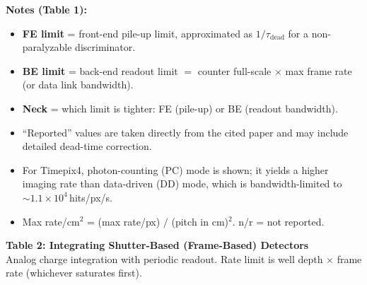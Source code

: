 \documentclass[10pt]{article}
\begin{document}
\vspace{4pt}
\noindent\textbf{Notes (Table 1):}
\begin{itemize}\setlength{\itemsep}{1pt}
  \item \textbf{FE limit} = front-end pile-up limit, approximated as $1/\tau_\mathrm{dead}$ for a non-paralyzable discriminator.
  \item \textbf{BE limit} = back-end readout limit $=$ counter full-scale $\times$ max frame rate (or data link bandwidth).
  \item \textbf{Neck} = which limit is tighter: FE (pile-up) or BE (readout bandwidth).
  \item ``Reported'' values are taken directly from the cited paper and may include detailed dead-time correction.
  \item For Timepix4, photon-counting (PC) mode is shown; it yields a higher imaging rate than
    data-driven (DD) mode, which is bandwidth-limited to ${\sim}1.1\times10^4$\,hits/px/s.
  \item Max rate/cm$^2$ = (max rate/px) $/$ (pitch in cm)$^2$.  n/r = not reported.
\end{itemize}

\clearpage

\begin{center}
{\Large\bfseries Table 2: Integrating Shutter-Based (Frame-Based) Detectors}\\[4pt]
{\small Analog charge integration with periodic readout.
Rate limit is well depth $\times$ frame rate (whichever saturates first).}
\end{center}

\vspace{4pt}

\scriptsize
\setlength{\LTcapwidth}{\textwidth}
\end{document}
